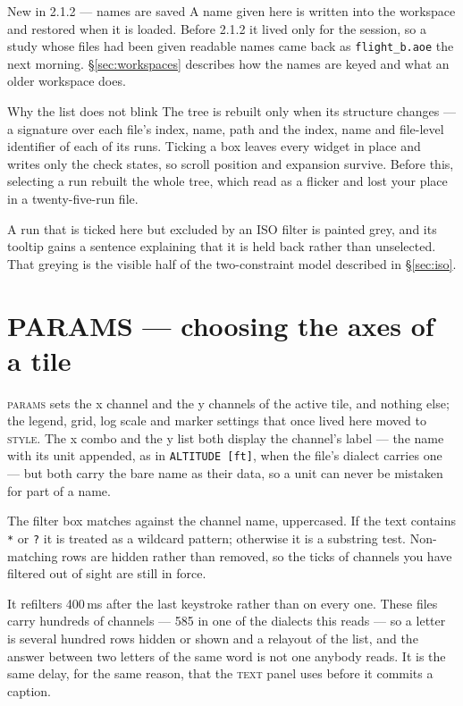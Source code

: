 \documentclass[11pt,a4paper,oneside]{report}
\newcommand{\appver}{2.1.2}
\newcommand{\code}[1]{\texttt{#1}}
\newcommand{\tab}[1]{\textsc{#1}}
\begin{document}
\begin{aoenew}{New in \appver{} --- names are saved}
A name given here is written into the workspace and restored when it is loaded.
Before \appver{} it lived only for the session, so a study whose files had been
given readable names came back as \code{flight\_b.aoe} the next morning.
\S\ref{sec:workspaces} describes how the names are keyed and what an older
workspace does.
\end{aoenew}

\begin{aoenote}{Why the list does not blink}
The tree is rebuilt only when its structure changes --- a signature over each
file's index, name, path and the index, name and file-level identifier of each of
its runs. Ticking a box leaves every widget in place and writes only the check
states, so scroll position and expansion survive. Before this, selecting a run
rebuilt the whole tree, which read as a flicker and lost your place in a
twenty-five-run file.
\end{aoenote}

A run that is ticked here but excluded by an ISO filter is painted grey, and its
tooltip gains a sentence explaining that it is held back rather than unselected.
That greying is the visible half of the two-constraint model described in
\S\ref{sec:iso}.

\section{PARAMS --- choosing the axes of a tile}
\label{sec:params}

\tab{params} sets the x channel and the y channels of the active tile, and
nothing else; the legend, grid, log scale and marker settings that once lived
here moved to \tab{style}. The x combo and the y list both display the channel's
label --- the name with its unit appended, as in \code{ALTITUDE [ft]}, when the
file's dialect carries one --- but both carry the bare name as their data, so a
unit can never be mistaken for part of a name.

The filter box matches against the channel name, uppercased. If the text
contains \code{*} or \code{?} it is treated as a wildcard pattern; otherwise it
is a substring test. Non-matching rows are hidden rather than removed, so the
ticks of channels you have filtered out of sight are still in force.

It refilters 400\,ms after the last keystroke rather than on every one. These
files carry hundreds of channels --- 585 in one of the dialects this reads ---
so a letter is several hundred rows hidden or shown and a relayout of the list,
and the answer between two letters of the same word is not one anybody reads.
It is the same delay, for the same reason, that the \tab{text} panel uses
before it commits a caption.
\end{document}
